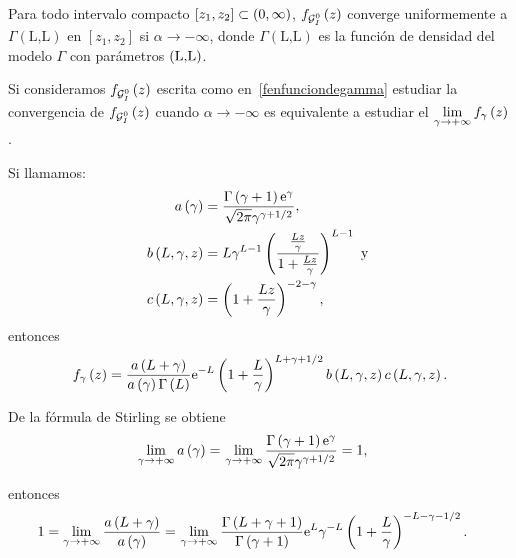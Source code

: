 \begin{proposition}
	\label{conv1}
	Para todo intervalo compacto $[z_{1},z_{2}]\subset\left( 0,\infty \right)$, $f_{\mathcal{G}_I^0}\left( z \right)$ converge
	uniformemente a $\Gamma(\text{L,L})$ en $[z_{1},z_{2}]$ si $\alpha\to -\infty$,
	donde $\Gamma(\text{L,L})$ es la función de densidad del modelo $\Gamma$ con parámetros $\left( \text{L,L} \right)$.
\end{proposition}

\begin{dem}
Si consideramos $f_{\mathcal{G}_I^0}\left( z \right)$ escrita como en~\eqref{fenfunciondegamma} estudiar la convergencia de $f_{\mathcal{G}_I^0}\left( z \right)$ cuando $\alpha\to -\infty$ es equivalente a estudiar el $\lim\limits_{\gamma\to+\infty} f_{\gamma}\left( z \right)$. 
		
Si llamamos:
	\begin{align*}
		a\left( \gamma \right) &= \frac{\Gamma\left( \gamma+1 \right)\mathrm{e}^{\gamma}}{\sqrt{2\pi}\gamma^{\gamma+1/2}},\\
		b\left( L,\gamma,z \right) &=L\gamma^{L-1}\left( \frac{\frac{Lz}{\gamma}}{1+\frac{Lz}{\gamma}} \right)^{L-1} \text{ y }\\
		c\left( L,\gamma,z \right) &= \left( 1+\frac{Lz}{\gamma} \right)^{-2-\gamma},
	\end{align*}
entonces 
\begin{align}
\label{GIOfunciongamma}
f_{\gamma}\left( z \right) = \frac{a\left( L+\gamma \right)}{a\left( \gamma \right)\Gamma\left( L \right)}\mathrm{e}^{-L}\left( 1+\frac{L}{\gamma} \right)^{L+\gamma+1/2}
b\left( L,\gamma,z \right)c\left( L,\gamma,z \right).
\end{align}


De la fórmula de Stirling se obtiene
	\begin{align*}
	\lim_{\gamma\to+\infty} a\left( \gamma \right) = 
	&\, \lim_{\gamma\to+\infty}\frac{\Gamma\left( \gamma+1 \right)\mathrm{e}^{\gamma}}{\sqrt{2\pi}\gamma^{\gamma+1/2}} = 1,
	\end{align*}
	
entonces
	\begin{align*}
	1=\lim_{\gamma\to+\infty} \frac{a\left( L+\gamma \right)}{a\left( \gamma \right)} = 
	&\, \lim_{\gamma\to+\infty}\frac{\Gamma\left( L+\gamma+1 \right)}{\Gamma\left( \gamma+1 \right)}
	\mathrm{e}^{L}\gamma^{-L}\left( 1+\frac{L}{\gamma} \right)^{-L-\gamma-1/2}.
	\end{align*}


\end{dem}
